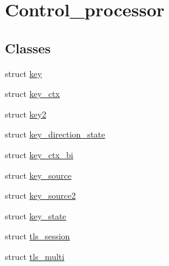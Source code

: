 \hypertarget{group__control__processor}{}\section{Control\+\_\+processor}
\label{group__control__processor}
\subsection*{Classes}
\begin{DoxyCompactItemize}
\item 
struct \hyperlink{structkey}{key}
\item 
struct \hyperlink{structkey__ctx}{key\+\_\+ctx}
\item 
struct \hyperlink{structkey2}{key2}
\item 
struct \hyperlink{structkey__direction__state}{key\+\_\+direction\+\_\+state}
\item 
struct \hyperlink{structkey__ctx__bi}{key\+\_\+ctx\+\_\+bi}
\item 
struct \hyperlink{structkey__source}{key\+\_\+source}
\item 
struct \hyperlink{structkey__source2}{key\+\_\+source2}
\item 
struct \hyperlink{structkey__state}{key\+\_\+state}
\item 
struct \hyperlink{structtls__session}{tls\+\_\+session}
\item 
struct \hyperlink{structtls__multi}{tls\+\_\+multi}
\end{DoxyCompactItemize}
